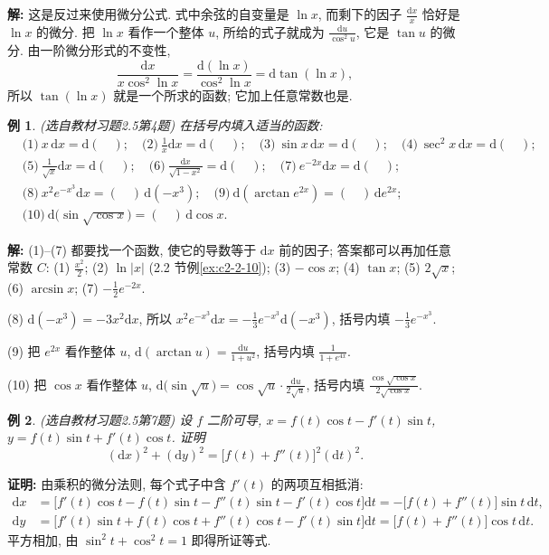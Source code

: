 \documentclass[UTF8,openany]{ctexbook}
\theoremstyle{chinesetextbook}
\newtheorem{example}{例}[section]
\newenvironment{cnproof}{\par\indent\textbf{证明:} \ignorespaces}{\par}
\newenvironment{cnsolution}{\par\indent\textbf{解:} \ignorespaces}{\par}
\newcommand{\dd}{\mathrm d}
\begin{document}
\begin{cnsolution}
这是反过来使用微分公式. 式中余弦的自变量是 $\ln x$, 而剩下的因子 $\displaystyle\frac{\dd x}x$ 恰好是 $\ln x$ 的微分. 把 $\ln x$ 看作一个整体 $u$, 所给的式子就成为 $\displaystyle\frac{\dd u}{\cos^2u}$, 它是 $\tan u$ 的微分. 由一阶微分形式的不变性,
\[
\frac{\dd x}{x\cos^2\ln x}=\frac{\dd(\ln x)}{\cos^2\ln x}=\dd\tan(\ln x),
\]
所以 $\tan(\ln x)$ 就是一个所求的函数; 它加上任意常数也是.
\end{cnsolution}
\begin{example}\label{ex:c2-h5-4}
\textnormal{(选自教材习题2.5第4题)} 在括号内填入适当的函数:
\[
\begin{aligned}
&\text{(1)}\ x\,\dd x=\dd(\quad);\quad\text{(2)}\ \frac1x\dd x=\dd(\quad);\quad\text{(3)}\ \sin x\,\dd x=\dd(\quad);\quad\text{(4)}\ \sec^2x\,\dd x=\dd(\quad);\\
&\text{(5)}\ \frac1{\sqrt x}\dd x=\dd(\quad);\quad\text{(6)}\ \frac{\dd x}{\sqrt{1-x^2}}=\dd(\quad);\quad\text{(7)}\ e^{-2x}\dd x=\dd(\quad);\\
&\text{(8)}\ x^2e^{-x^3}\dd x=(\quad)\,\dd(-x^3);\quad\text{(9)}\ \dd(\arctan e^{2x})=(\quad)\,\dd e^{2x};\\
&\text{(10)}\ \dd\bigl(\sin\sqrt{\cos x}\bigr)=(\quad)\,\dd\cos x.
\end{aligned}
\]
\end{example}
\begin{cnsolution}
(1)–(7) 都要找一个函数, 使它的导数等于 $\dd x$ 前的因子; 答案都可以再加任意常数 $C$: (1) $\displaystyle\frac{x^2}2$; (2) $\ln|x|$ (2.2 节例\ref{ex:c2-2-10}); (3) $-\cos x$; (4) $\tan x$; (5) $2\sqrt x$; (6) $\arcsin x$; (7) $\displaystyle-\frac12e^{-2x}$.

(8) $\dd(-x^3)=-3x^2\dd x$, 所以 $\displaystyle x^2e^{-x^3}\dd x=-\frac13e^{-x^3}\dd(-x^3)$, 括号内填 $\displaystyle-\frac13e^{-x^3}$.

(9) 把 $e^{2x}$ 看作整体 $u$, $\displaystyle\dd(\arctan u)=\frac{\dd u}{1+u^2}$, 括号内填 $\displaystyle\frac1{1+e^{4x}}$.

(10) 把 $\cos x$ 看作整体 $u$, $\displaystyle\dd\bigl(\sin\sqrt u\bigr)=\cos\sqrt u\cdot\frac{\dd u}{2\sqrt u}$, 括号内填 $\displaystyle\frac{\cos\sqrt{\cos x}}{2\sqrt{\cos x}}$.
\end{cnsolution}
\begin{example}\label{ex:c2-h5-7}
\textnormal{(选自教材习题2.5第7题)} 设 $f$ 二阶可导, $x=f(t)\cos t-f'(t)\sin t$, $y=f(t)\sin t+f'(t)\cos t$. 证明
\[
(\dd x)^2+(\dd y)^2=\bigl[f(t)+f''(t)\bigr]^2(\dd t)^2.
\]
\end{example}
\begin{cnproof}
由乘积的微分法则, 每个式子中含 $f'(t)$ 的两项互相抵消:
\[
\begin{aligned}
\dd x&=\bigl[f'(t)\cos t-f(t)\sin t-f''(t)\sin t-f'(t)\cos t\bigr]\dd t=-\bigl[f(t)+f''(t)\bigr]\sin t\,\dd t,\\
\dd y&=\bigl[f'(t)\sin t+f(t)\cos t+f''(t)\cos t-f'(t)\sin t\bigr]\dd t=\bigl[f(t)+f''(t)\bigr]\cos t\,\dd t.
\end{aligned}
\]
平方相加, 由 $\sin^2t+\cos^2t=1$ 即得所证等式.
\end{cnproof}
\end{document}
